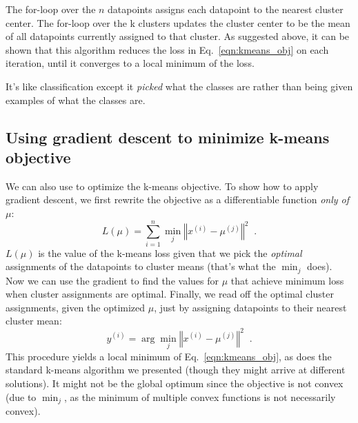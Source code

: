 The for-loop over the $n$ datapoints assigns each datapoint to the
nearest cluster center. The for-loop over the k clusters updates the
cluster center to be the mean of all datapoints currently assigned to
that cluster. As suggested above, it can be shown that this algorithm
reduces the loss in Eq.~\ref{eqn:kmeans_obj} on each iteration, until
it converges to a local minimum of the loss.


It's like classification except it \textit{picked} what the classes
are rather than being given examples of what the classes are.

\subsection{Using gradient descent to minimize k-means objective}

We can also use   to optimize the k-means objective.  To show how to apply
gradient descent, we first rewrite the objective as a differentiable
function \textit{only of} $\mu$:
\begin{equation}
  L(\mu) = \sum_{i=1}^n \min_j \left\Vert x^{(i)} - \mu^{(j)} \right\Vert^2 \;\;.
\end{equation}
$L(\mu)$ is the value of the k-means loss given that we pick the
\textit{optimal} assignments of the datapoints to cluster means
(that's what the $\min_j$ does). Now we can use the
gradient to find
the values for $\mu$ that achieve minimum loss when cluster
assignments are optimal.  Finally, we read off the optimal cluster
assignments, given the optimized $\mu$, just by assigning datapoints
to their nearest cluster mean:
\begin{equation}
  y^{(i)} = \arg\min_j \left\Vert x^{(i)} - \mu^{(j)} \right\Vert^2 \;\;.
\end{equation}
This procedure yields a local minimum of Eq.~\ref{eqn:kmeans_obj}, as
does the standard k-means algorithm we presented (though they might
arrive at different solutions). It might not be the global optimum
since the objective is not convex (due to $\min_j$, as the minimum of
multiple convex functions is not necessarily convex).

